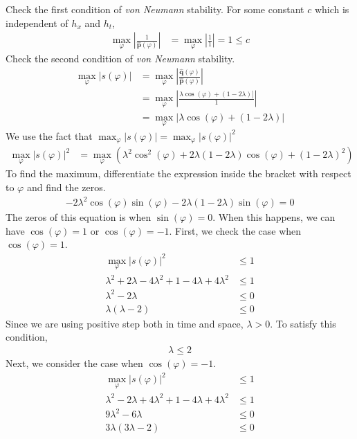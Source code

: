 \documentclass[11pt, letterpaper, hidelinks]{article}
\theoremstyle{definition}
\newcommand{\abs}[1]{\left\lvert#1\right\rvert}
\begin{document}
Check the first condition of \textit{von Neumann} stability. For some constant $c$ which is independent of $h_x$ and $h_t$,
\begin{align*}
    \max_\varphi \abs{\frac{1}{\hat{\textbf{p}}(\varphi)}} & =  \max_\varphi \abs{\frac{1}{1}} = 1 \le c
\end{align*}
Check the second condition of \textit{von Neumann} stability.
\begin{align*}
    \max_\varphi \abs{s(\varphi)}
     & = \max_\varphi \abs{\frac{\hat{\textbf{q}}(\varphi)}{\hat{\textbf{p}}(\varphi)}  } \\
     & = \max_\varphi \abs{\frac{\lambda \cos(\varphi) + (1-2\lambda)]}{1}}               \\
     & = \max_\varphi \abs{\lambda \cos(\varphi) + (1-2\lambda)}
\end{align*}
We use the fact that $\max_\varphi \abs{s(\varphi)} = \max_\varphi \abs{s(\varphi)}^2$
\begin{align*}
    \max_\varphi \abs{s(\varphi)}^2
     & = \max_\varphi \left( \lambda^2 \cos^2(\varphi) + 2\lambda(1-2\lambda)\cos(\varphi) + (1-2\lambda)^2  \right)
\end{align*}
To find the maximum, differentiate the expression inside the bracket with respect to $\varphi$ and find the zeros.
\begin{align*}
    -2\lambda^2\cos(\varphi)\sin(\varphi) - 2\lambda(1-2\lambda)\sin(\varphi) = 0
\end{align*}
The zeros of this equation is when $\sin(\varphi)=0$. When this happens, we can have $\cos(\varphi)=1$ or $\cos(\varphi)=-1$. First, we check the case when $\cos(\varphi)=1$.
\begin{align*}
    \max_\varphi \abs{s(\varphi)}^2                               & \le 1 \\
    \lambda^2 + 2\lambda - 4\lambda^2 + 1 - 4\lambda + 4\lambda^2 & \le 1 \\
    \lambda^2-2\lambda                                            & \le 0 \\
    \lambda(\lambda-2)                                            & \le 0
\end{align*}
Since we are using positive step both in time and space, $\lambda>0$. To satisfy this condition,
\begin{align*}
    \lambda \le 2
\end{align*}
Next, we consider the case when $\cos(\varphi)=-1$.
\begin{align*}
    \max_\varphi \abs{s(\varphi)}^2                               & \le 1 \\
    \lambda^2 - 2\lambda + 4\lambda^2 + 1 - 4\lambda + 4\lambda^2 & \le 1 \\
    9\lambda^2-6\lambda                                           & \le 0 \\
    3\lambda(3\lambda-2)                                          & \le 0
\end{align*}
\end{document}

